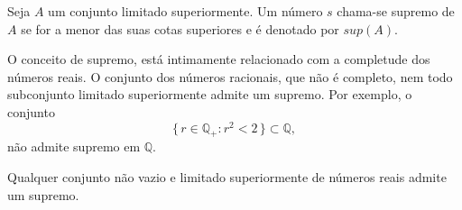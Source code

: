 \documentclass[../main.tex]{subfiles}
\begin{document}
\begin{defi}
    Seja $A$ um conjunto limitado superiormente. Um número $s$ chama-se supremo de $A$ se for a menor das suas cotas superiores e é denotado por $sup(A)$.
\end{defi}
\begin{ex}
O conceito de supremo, está intimamente relacionado com a completude dos números reais. O conjunto dos números racionais, que não é completo, nem todo subconjunto limitado superiormente admite um supremo. Por exemplo, o conjunto 
\[ \{\, r \in \mathbb{Q}_+ : r^2 < 2 \,\} \subset \mathbb{Q}, \] 
não admite supremo em $\mathbb{Q}$.
\end{ex}
\begin{teo}\label{enum-teo-supremo}
    Qualquer conjunto não vazio e limitado superiormente de números reais admite um supremo. 
\end{teo}
\end{document}
